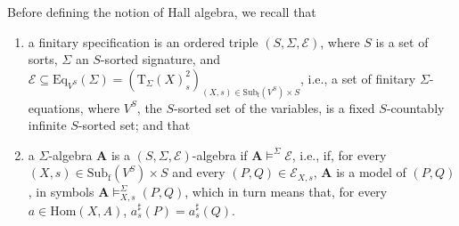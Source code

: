 \documentclass{amsart}
\theoremstyle{plain}
\theoremstyle{definition}
\begin{document}
Before defining the notion of Hall algebra, we recall that
\begin{enumerate}
	\item a finitary specification is an ordered triple $(S,\Sigma,\mathcal{E})$, where $S$ is a set of sorts, $\Sigma$ an $S$-sorted signature, and $\mathcal{E}\subseteq\mathrm{Eq}_{V^{S}}(\Sigma)=
	(\mathrm{T}_{\Sigma}(X)_{s}^{2})_{(X,s)\in \mathrm{Sub}_{\mathrm{f}}(V^{S})\times S}$, i.e., a set of finitary  $\Sigma$-equations, where $V^{S}$, the $S$-sorted set of the variables, is a fixed $S$-countably infinite $S$-sorted set; and that
	\item a $\Sigma$-algebra $\mathbf{A}$ is a $(S,\Sigma,\mathcal{E})$-algebra if $\mathbf{A}\models^{\Sigma} \mathcal{E}$, i.e., if, for every $(X,s)\in \mathrm{Sub}_{\mathrm{f}}(V^{S})\times S$ and every $(P,Q)\in \mathcal{E}_{X,s}$, $\mathbf{A}$ is a model of $(P,Q)$, in symbols $\mathbf{A}\models^{\Sigma}_{X,s} (P,Q)$, which in turn means that, for every $a\in \mathrm{Hom}(X,A)$, $a^{\sharp}_{s}(P) = a^{\sharp}_{s}(Q)$.
\end{enumerate}
\end{document}
